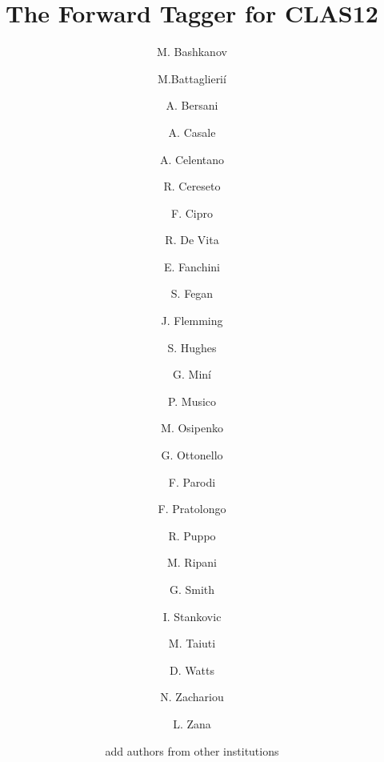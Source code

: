 \title{The Forward Tagger for CLAS12} %

\author[YORKaddress]{M. Bashkanov}
\author[GEaddress]{M.Battaglieri\'i}
\author[GEaddress]{A. Bersani}
\author[GEaddress]{A. Casale}
\author[GEaddress]{A. Celentano}
\author[GEaddress]{R. Cereseto}
\author[GEaddress]{F. Cipro}
\author[GEaddress]{R. De Vita}
\author[GEaddress]{E. Fanchini}
\author[JLABaddress]{S. Fegan}
\author[EDINaddress]{J. Flemming}
\author[EDINaddress]{S. Hughes}
\author[GEaddress]{G. Min\'i}
\author[GEaddress]{P. Musico}
\author[GEaddress]{M. Osipenko}
\author[GEaddress]{G. Ottonello}
\author[GEaddress]{F. Parodi}
\author[GEaddress]{F. Pratolongo}
\author[GEaddress]{R. Puppo}
\author[GEaddress]{M. Ripani}
\author[EDINaddress]{G. Smith}
\author[EDINaddress]{I. Stankovic}
\author[GEaddress,UNIGEaddress]{M. Taiuti}
\author[YORKaddress]{D. Watts}
\author[YORKaddress]{N. Zachariou}
\author[JLABaddress]{L. Zana}
\author{add authors from other institutions}


\address[GEaddress]{INFN - Sezione di Genova, Via Dodecaneso 33, I-16146 Genova,Italy}
\address[RM2address]{INFN, Sezione di Roma Tor Vergata, 00133 Rome, Italy}
\address[TOaddress]{INFN, Sezione di Torino, 10125 Torino, Italy}
\address[UNIGEaddress]{Universit\'a degli Studi di Genova, Via Dodecaneso 33, I-16146 Genova,Italy} 
\address[UNIRTVaddress]{Universit\'a di Roma Tor Vergata, 00133 Rome Italy} 
\address[JLABaddress]{Jefferson Lab, Newport News, VA 23606, USA}
\address[CEAaddress]{IRFU, CEA, Universit\'e Paris-Saclay, F-91191 Gif-sur-Yvette, France}
\address[YORKaddress]{University of York, York YO10 5DD, United Kingdom}
\address[EDINaddress]{University of Edinburgh, Edinburgh EH9 3FD, United Kingdom}
